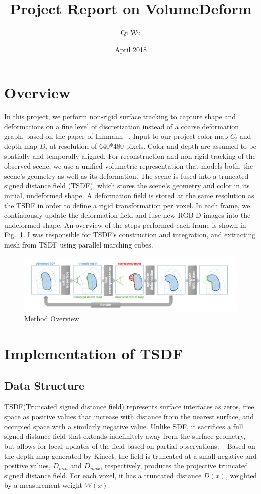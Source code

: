 \documentclass{article}
\title{Project Report on VolumeDeform}
\author{Qi Wu }
\date{April 2018}
\begin{document}
\maketitle

\section{Overview}
In this project, we perform non-rigid surface tracking to capture shape and deformations on a fine level of discretization instead of a coarse deformation graph, based on the paper of Innmann ~\cite{innmann2016volumedeform}. Input to our project color map $C_i$ and depth map $D_i$ at resolution of 640*480 pixels. Color and depth are assumed to be spatially and temporally aligned. For reconstruction and non-rigid tracking of the observed scene, we use a unified volumetric representation that models both, the scene’s geometry as well as its deformation. The scene is fused into a truncated signed distance field (TSDF), which stores the scene’s geometry and color in its initial, undeformed shape. A deformation field is stored at the same resolution as the TSDF in order to define a rigid transformation per voxel. In each frame, we continuously update the deformation field and fuse new RGB-D images into the undeformed shape. An overview of the steps performed each frame is shown in Fig.~\ref{fig:pipeline}. I was responsible for TSDF's construction and integration, and extracting mesh from TSDF using parallel marching cubes.
\begin{figure}[htp]
\centering
\includegraphics[width=12cm]{figures/pipeline.png}
\caption{Method Overview}
\label{fig:pipeline}
\end{figure}


\section{Implementation of TSDF}
\subsection{Data Structure}
TSDF(Truncated signed distance field) represents surface interfaces as zeros, free space as positive values that increase with distance from the nearest surface, and occupied space with a similarly negative value. Unlike SDF, it sacrifices a full signed distance field that extends indefinitely away from the surface geometry, but allows for local updates of the field based on partial observations. ~\cite{CanelhasDanielRicao2017Tsdf} Based on the depth map generated by Kinect, the field is truncated at a small negative and positive values, $D_{min}$ and $D_{max}$, respectively, produces the projective truncated signed distance field. For each voxel, it has a truncated distance $D{(x)}$, weighted by a measurement weight $W{(x)}$.
\end{document}
